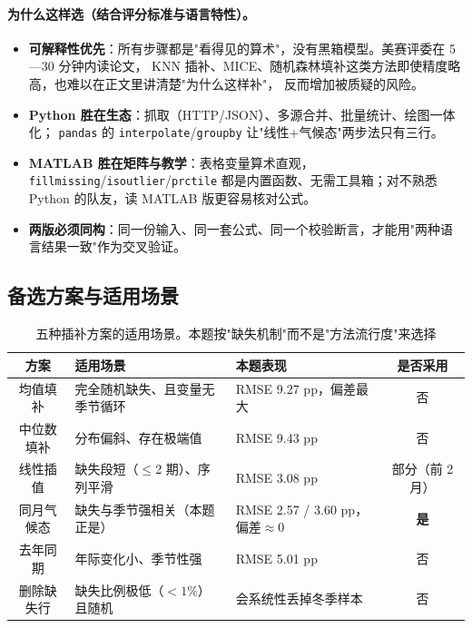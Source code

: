 \documentclass[11pt,a4paper]{ctexart}
\begin{document}
\paragraph{为什么这样选（结合评分标准与语言特性）。}
\begin{itemize}
\item \textbf{可解释性优先}：所有步骤都是"看得见的算术"，没有黑箱模型。美赛评委在 5—30 分钟内读论文，
KNN 插补、MICE、随机森林填补这类方法即使精度略高，也难以在正文里讲清楚"为什么这样补"，
反而增加被质疑的风险。
\item \textbf{Python 胜在生态}：抓取（HTTP/JSON）、多源合并、批量统计、绘图一体化；
\texttt{pandas} 的 \texttt{interpolate}/\texttt{groupby} 让"线性+气候态"两步法只有三行。
\item \textbf{MATLAB 胜在矩阵与教学}：表格变量算术直观，\texttt{fillmissing}/\texttt{isoutlier}/\texttt{prctile}
都是内置函数、无需工具箱；对不熟悉 Python 的队友，读 MATLAB 版更容易核对公式。
\item \textbf{两版必须同构}：同一份输入、同一套公式、同一个校验断言，才能用"两种语言结果一致"作为交叉验证。
\end{itemize}

\subsection{备选方案与适用场景}

\begin{table}[H]\centering\small
\begin{tabularx}{\textwidth}{|c|X|X|c|}
\toprule
方案 & 适用场景 & 本题表现 & 是否采用 \\
\midrule
均值填补 & 完全随机缺失、且变量无季节循环 & RMSE 9.27 pp，偏差最大 & 否 \\
中位数填补 & 分布偏斜、存在极端值 & RMSE 9.43 pp & 否 \\
线性插值 & 缺失段短（$\le$2 期）、序列平滑 & RMSE 3.08 pp & 部分（前 2 月） \\
同月气候态 & 缺失与季节强相关（本题正是） & RMSE 2.57 / 3.60 pp，偏差$\approx$0 & \textbf{是} \\
去年同期 & 年际变化小、季节性强 & RMSE 5.01 pp & 否 \\
删除缺失行 & 缺失比例极低（$<1\%$）且随机 & 会系统性丢掉冬季样本 & 否 \\
\bottomrule
\end{tabularx}
\caption{五种插补方案的适用场景。本题按"缺失机制"而不是"方法流行度"来选择}
\end{table}
\end{document}
